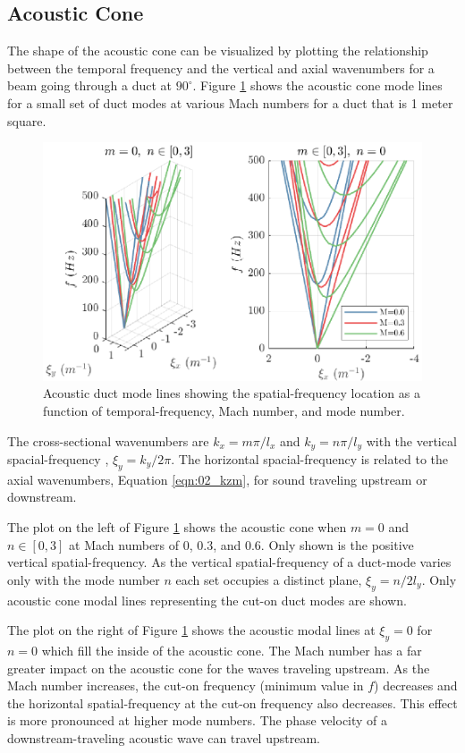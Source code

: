 \subsection{Acoustic Cone}
The shape of the acoustic cone can be visualized by plotting the relationship between the temporal frequency and the vertical and axial wavenumbers for a beam going through a duct at $90^\circ$.
Figure \ref{fig:04_dispersion_sound} shows the acoustic cone mode lines for a small set of duct modes at various Mach numbers for a duct that is 1 meter square.
\begin{figure}
  \centering
  \includegraphics{../matlab/04_dispersion_analysis/dispersion_sound.eps}
  \caption{Acoustic duct mode lines showing the spatial-frequency location as a function of temporal-frequency, Mach number, and mode number.}
  \label{fig:04_dispersion_sound}
\end{figure}
The cross-sectional wavenumbers are $k_x = m\pi/l_x$ and $k_y = n\pi/l_y$ with the vertical spacial-frequency , $\xi_y=k_y/2\pi$.
The horizontal spacial-frequency is related to the axial wavenumbers, Equation \ref{eqn:02_kzm}, for sound traveling upstream or downstream.

The plot on the left of Figure \ref{fig:04_dispersion_sound} shows the acoustic cone when $m=0$ and $n\in [0,3]$ at Mach numbers of 0, 0.3, and 0.6.
Only shown is the positive vertical spatial-frequency.
As the vertical spatial-frequency of a duct-mode varies only with the mode number $n$ each set occupies a distinct plane, $\xi_y=n/2l_y$.
Only acoustic cone modal lines representing the cut-on duct modes are shown.

The plot on the right of Figure \ref{fig:04_dispersion_sound} shows the acoustic modal lines at $\xi_y=0$ for $n=0$ which fill the inside of the acoustic cone.
The Mach number has a far greater impact on the acoustic cone for the waves traveling upstream.
As the Mach number increases, the cut-on frequency (minimum value in $f$) decreases and the horizontal spatial-frequency at the cut-on frequency also decreases.
This effect is more pronounced at higher mode numbers.
The phase velocity of a downstream-traveling acoustic wave can travel upstream.


